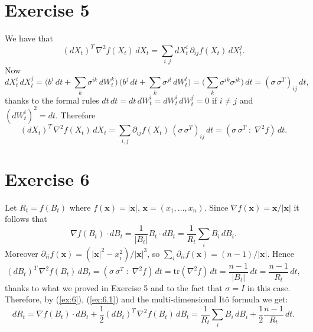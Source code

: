 \documentclass[a4paper,11pt]{article}
\theoremstyle{definition}
\theoremstyle{plain}
\theoremstyle{remark}
\begin{document}
\section*{Exercise 5}

We have that
$$
(dX_t)^T\,\nabla^2f(X_t)\,dX_t = \sum_{i,j}dX_t^i\,\partial_{ij}f(X_t)\,dX_t^j.
$$
Now 
$$
dX_t^i\,dX_t^j = \Big(b^i\,dt + \sum_k\sigma^{ik}\,dW^k_t\Big)\,\Big(b^j\,dt + \sum_k\sigma^{jl}\,dW^l_t\Big) = \Big(\sum_k\sigma^{ik}\sigma^{jk}\Big)\,dt = (\sigma\,\sigma^T)_{ij}\,dt,
$$
thanks to the formal rules $dt\,dt = dt\,dW_t^i = dW_t^i\,dW_t^j = 0$ if $i\neq j$ and $(dW_t^i)^2 = dt$.
Therefore
$$
(dX_t)^T\,\nabla^2f(X_t)\,dX_t = \sum_{i,j} \partial_{ij}f(X_t)\,(\sigma\,\sigma^T)_{ij}\,dt = (\sigma\,\sigma^T\;:\;\nabla^2f)\,dt.
$$

\section*{Exercise 6}

Let $R_t = f(B_t)$ where $f(\mathbf{x})=|\mathbf{x}|$, $\mathbf{x}=(x_1,\dots,x_n)$. Since $\nabla f(\mathbf{x}) = \mathbf{x}/|\mathbf{x}|$ it follows that
\begin{equation}\label{ex:6}
\nabla f(B_t) \cdot dB_t = \frac{1}{|B_t|}B_t\cdot dB_t = \frac{1}{R_t}\sum_iB_i\,dB_i.
\end{equation}
Moreover $\partial_{ii}f(\mathbf{x}) = (|\mathbf{x}|^2-x^2_i)/|\mathbf{x}|^3$, so $\sum_i\partial_{ii}f(\mathbf{x}) = (n-1)/|\mathbf{x}|$. Hence
\begin{equation}\label{ex:6.1}
(dB_t)^T\,\nabla^2 f(B_t)\,dB_t = (\sigma\,\sigma^T\;:\;\nabla^2f)\,dt =\mathrm{tr}(\nabla^2 f)\,dt = \frac{n-1}{|B_t|}\,dt = \frac{n-1}{R_t}\,dt,
\end{equation}
thanks to what we proved in Exercise 5 and to the fact that $\sigma = I$ in this case.
Therefore, by (\ref{ex:6}), (\ref{ex:6.1}) and the multi-dimensional It\^o formula we get:
$$
dR_t = \nabla f(B_t) \cdot dB_t + \frac{1}{2}(dB_t)^T\,\nabla^2 f(B_t)\,dB_t = \frac{1}{R_t}\sum_iB_i\,dB_i + \frac{1}{2}\frac{n-1}{R_t}\,dt.
$$
\end{document}
